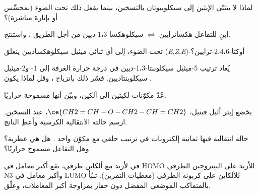 \begin{exercise}[$\star$]\label{exo:b3:pericyclic:4}
لماذا لا يتثنّى الإيثين إلى سيكلوبيوتان بالتسخين، بينما يفعل ذلك تحت الضوء
(بمحسِّس أو بإثارة مباشرة)؟
\end{exercise}

\begin{exercise}[$\star\star$]\label{exo:b3:pericyclic:5}
ابنِ  للتفاعل هكساترايين $\rightleftharpoons$ سيكلوهكسا-1،3-ديين من أجل
الطريق ، واستنتج.
\end{exercise}

\begin{exercise}[$\star\star$]\label{exo:b3:pericyclic:6}
تحت الضوء، إلى أي ثنائي ميثيل سيكلوهكساديين ينغلق (\textit{E},\textit{Z},\textit{E})-أوكتا-2،4،6-ترايين؟
\end{exercise}

\begin{exercise}[$\star\star$]\label{exo:b3:pericyclic:7}
يُعاد ترتيب 5-ميثيل سيكلوبنتا-1،3-ديين في درجة حرارة الغرفة إلى 1- 
و2-ميثيل سيكلوبنتاديين. فسّر ذلك بانزياح ، وقل لماذا يكون .
\end{exercise}

\begin{exercise}[$\star\star$]\label{exo:b3:pericyclic:8}
عُدّ مكوّنات  لكيتين إلى ألكين، وبيّن
أنها مسموحة حراريًا.
\end{exercise}

\begin{exercise}[$\star\star$]\label{exo:b3:pericyclic:9}
يخضع إيثر أليل فينيل، $\ce{CH2=CH-O-CH2-CH=CH2}$،  عند
التسخين. ارسم حالته الانتقالية الكرسية وأعطِ الناتج.
\end{exercise}

\begin{exercise}[$\star\star\star$]\label{exo:b3:pericyclic:10}
حالة انتقالية فيها ثمانية إلكترونات في ترتيب حلقي مع مكوّن واحد . هل هي عطرية؟ وهل التفاعل مسموح حراريًا؟
\end{exercise}

\begin{exercise}[$\star\star\star$]\label{exo:b3:pericyclic:11}
في  لأزيد مع ألكاين طرفي، يقع أكبر
معامل في HOMO للأزيد على النيتروجين الطرفي N3 وأكبر
معامل في LUMO للألكاين على كربونه الطرفي (معطيات التمرين).
تنبّأ بالمتماكب الموضعي المفضل دون حفاز بمزاوجة أكبر
المعاملات، وعلّق.
\end{exercise}

